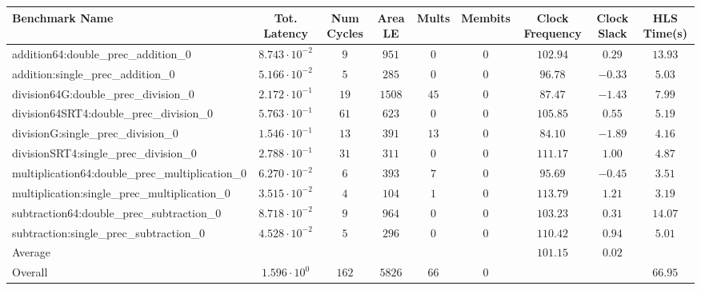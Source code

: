 \begin{tabular}{|l|c|c|c|c|c|c|c|c|}
\hline
Benchmark Name                                   & Tot. Latency            & Num Cycles & Area LE  & Mults  & Membits & Clock Frequency & Clock Slack & HLS Time(s) \\
\hline
addition64:double\_prec\_addition\_0             & $ 8.743 \cdot 10^{-2} $ & $ 9      $ & $ 951  $ & $ 0  $ & $ 0   $ & $ 102.94      $ & $ 0.29    $ & $ 13.93   $ \\
addition:single\_prec\_addition\_0               & $ 5.166 \cdot 10^{-2} $ & $ 5      $ & $ 285  $ & $ 0  $ & $ 0   $ & $ 96.78       $ & $ -0.33   $ & $ 5.03    $ \\
division64G:double\_prec\_division\_0            & $ 2.172 \cdot 10^{-1} $ & $ 19     $ & $ 1508 $ & $ 45 $ & $ 0   $ & $ 87.47       $ & $ -1.43   $ & $ 7.99    $ \\
division64SRT4:double\_prec\_division\_0         & $ 5.763 \cdot 10^{-1} $ & $ 61     $ & $ 623  $ & $ 0  $ & $ 0   $ & $ 105.85      $ & $ 0.55    $ & $ 5.19    $ \\
divisionG:single\_prec\_division\_0              & $ 1.546 \cdot 10^{-1} $ & $ 13     $ & $ 391  $ & $ 13 $ & $ 0   $ & $ 84.10       $ & $ -1.89   $ & $ 4.16    $ \\
divisionSRT4:single\_prec\_division\_0           & $ 2.788 \cdot 10^{-1} $ & $ 31     $ & $ 311  $ & $ 0  $ & $ 0   $ & $ 111.17      $ & $ 1.00    $ & $ 4.87    $ \\
multiplication64:double\_prec\_multiplication\_0 & $ 6.270 \cdot 10^{-2} $ & $ 6      $ & $ 393  $ & $ 7  $ & $ 0   $ & $ 95.69       $ & $ -0.45   $ & $ 3.51    $ \\
multiplication:single\_prec\_multiplication\_0   & $ 3.515 \cdot 10^{-2} $ & $ 4      $ & $ 104  $ & $ 1  $ & $ 0   $ & $ 113.79      $ & $ 1.21    $ & $ 3.19    $ \\
subtraction64:double\_prec\_subtraction\_0       & $ 8.718 \cdot 10^{-2} $ & $ 9      $ & $ 964  $ & $ 0  $ & $ 0   $ & $ 103.23      $ & $ 0.31    $ & $ 14.07   $ \\
subtraction:single\_prec\_subtraction\_0         & $ 4.528 \cdot 10^{-2} $ & $ 5      $ & $ 296  $ & $ 0  $ & $ 0   $ & $ 110.42      $ & $ 0.94    $ & $ 5.01    $ \\
\hline
Average                                          & $                     $ & $        $ & $      $ & $    $ & $     $ & $ 101.15      $ & $ 0.02    $ & $         $ \\
\hline
Overall                                          & $ 1.596 \cdot 10^{0}  $ & $ 162    $ & $ 5826 $ & $ 66 $ & $ 0   $ & $             $ & $         $ & $ 66.95   $ \\
\hline
\end{tabular}
